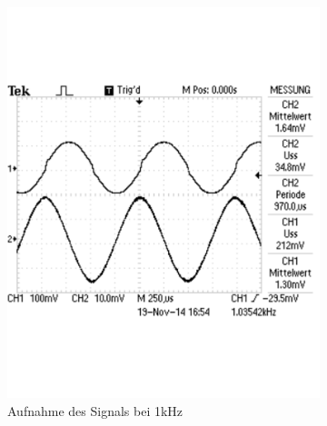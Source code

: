 \documentclass[12pt,a4paper]{article}
\begin{document}
\begin{figure}[H]
\begin{subfigure}[b]{0.28\textwidth}
                \includegraphics[width=\textwidth , scale = 0.4]{2_5_sin_1k.pdf}
                \caption[Aufnahme des Signals bei 1kHz]{Aufnahme des Signals bei 1kHz}
                \label{fig:2_5_sin_1k}
        \end{subfigure}
        \hfill
        \begin{subfigure}[b]{0.28\textwidth}

\end{subfigure}
\end{figure}
\end{document}
